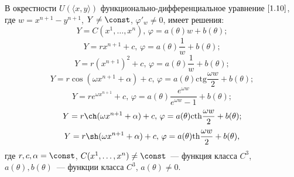 \begin{thm}\label{ttt1}
В окрестности $U(\langle x,y\rangle)$ функционально-дифференциальное уравнение $\eqref{1.10}$, где $w = x^{n+1} - y^{n+1}$, $Y\ne\const$, $\varphi'_w\ne0$, имеет решения:
\begin{equation}\label{1.12} Y = C(x^1,\ldots,x^n),\,\varphi = a(\theta)w + b(\theta); \end{equation}
\begin{equation}\label{1.13} Y = rx^{n+1} + c,\,\varphi = a(\theta)\dfrac{1}{w} + b(\theta); \end{equation}
\begin{equation}\label{1.14} Y = r(x^{n+1})^2 + c,\,\varphi = a(\theta)\dfrac{1}{w} + b(\theta); \end{equation}
\begin{equation}\label{1.15} Y =r\cos(\omega x^{n+1} + \alpha) + c,\,\varphi = a(\theta)\text{ctg}\dfrac{\omega w}{2} + b(\theta); \end{equation}
\begin{equation}\label{1.16} Y =re^{\omega x^{n+1}} + c,\,\varphi = a(\theta)\dfrac{e^{\omega w}}{e^{\omega w}-1} + b(\theta); \end{equation}
\begin{equation}\label{1.17} Y =r\ch(\omega x^{n+1} + \alpha) + c,\,\varphi = a(\theta)\text{cth}\dfrac{\omega w}{2} + b(\theta); \end{equation}
\begin{equation}\label{1.18} Y =r\sh(\omega x^{n+1} + \alpha) + c,\,\varphi = a(\theta)\text{th}\dfrac{\omega w}{2} + b(\theta), \end{equation}
где $r,c,\alpha = \const$, $C(x^1,\ldots,x^n)\ne\const$~--- функция класса $C^3$, $a(\theta), b(\theta)$~--- функции класса $C^3$, $a(\theta)\ne0$. \end{thm}

